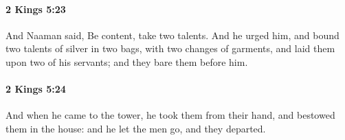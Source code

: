 		\paragraph{2 Kings 5:23} %
			\label{2KINGS-5-23}

			And Naaman said, Be content, take two talents. And he urged him, and bound two talents of silver in two bags, with two changes of garments, and laid them upon two of his servants; and they bare them before him.


		\paragraph{2 Kings 5:24} %
			\label{2KINGS-5-24}

			And when he came to the tower, he took them from their hand, and bestowed them in the house: and he let the men go, and they departed.


